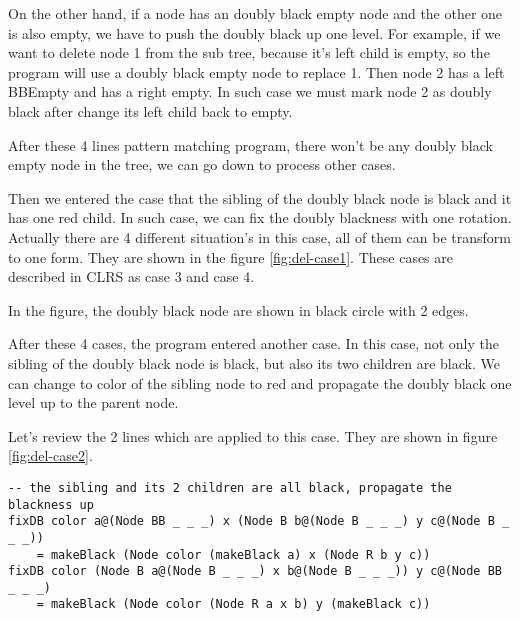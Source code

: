 \documentclass{article}
\begin{document}
On the other hand, if a node has an doubly black empty node and the other one is
also empty, we have to push the doubly black up one level. For example, if we want
to delete node 1 from the sub tree, because it's left child is empty, so the program
will use a doubly black empty node to replace 1. Then node 2 has a left BBEmpty and
has a right empty. In such case we must mark node 2 as doubly black after change its
left child back to empty.


After these 4 lines pattern matching program, there won't be any doubly black empty
node in the tree, we can go down to process other cases.

Then we entered the case that the sibling of the doubly black node is black and it
has one red child. In such case, we can fix the doubly blackness with one rotation.
Actually there are 4 different situation's in this case, all of them can be transform
to one form. They are shown in the figure \ref{fig:del-case1}. These cases are described
in CLRS as case 3 and case 4.


In the figure, the doubly black node are shown in black circle with 2 edges.

After these 4 cases, the program entered another case. In this case, not only the sibling
of the doubly black node is black, but also its two children are black. We can change to color
of the sibling node to red and propagate the doubly black one level up to the parent node.

Let's review the 2 lines which are applied to this case. They are shown in figure \ref{fig:del-case2}.

\begin{lstlisting}
-- the sibling and its 2 children are all black, propagate the blackness up
fixDB color a@(Node BB _ _ _) x (Node B b@(Node B _ _ _) y c@(Node B _ _ _))
    = makeBlack (Node color (makeBlack a) x (Node R b y c))
fixDB color (Node B a@(Node B _ _ _) x b@(Node B _ _ _)) y c@(Node BB _ _ _)
    = makeBlack (Node color (Node R a x b) y (makeBlack c))
\end{lstlisting}
\end{document}
